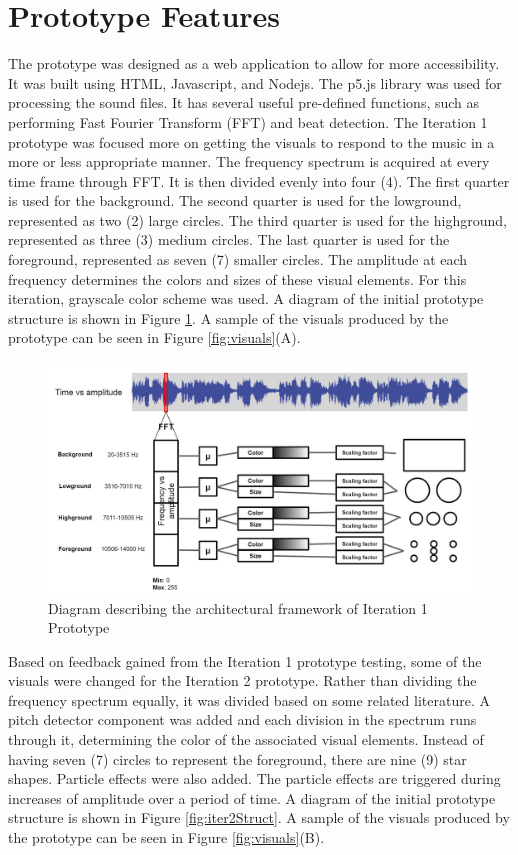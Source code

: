 \section{Prototype Features}
The prototype was designed as a web application to allow for more accessibility. It was built using HTML, Javascript, and Nodejs. The p5.js library was used for processing the sound files. It has several useful pre-defined functions, such as performing Fast Fourier Transform (FFT) and beat detection. The Iteration 1 prototype was focused more on getting the visuals to respond to the music in a more or less appropriate manner. The frequency spectrum is acquired at every time frame through FFT. It is then divided evenly into four (4). The first quarter is used for the background. The second quarter is used for the lowground, represented as two (2) large circles. The third quarter is used for the highground, represented as three (3) medium circles. The last quarter is used for the foreground, represented as seven (7) smaller circles. The amplitude at each frequency determines the colors and sizes of these visual elements. For this iteration, grayscale color scheme was used. A diagram of the initial prototype structure is shown in Figure \ref{fig:iter1Struct}. A sample of the visuals produced by the prototype can be seen in Figure  \ref{fig:visuals}(A).

\begin{figure}[h]
	\centering
	\includegraphics[width=2\columnwidth]{figures/iter1Struct.JPG}
    \caption{Diagram describing the architectural framework of Iteration 1 Prototype}
    \label{fig:iter1Struct}
\end{figure}

Based on feedback gained from the Iteration 1 prototype testing, some of the visuals were changed for the Iteration 2 prototype. Rather than dividing the frequency spectrum equally, it was divided based on some related literature. A pitch detector component was added and each division in the spectrum runs through it, determining the color of the associated visual elements. Instead of having seven (7) circles to represent the foreground, there are nine (9) star shapes. Particle effects were also added. The particle effects are triggered during increases of amplitude over a period of time. A diagram of the initial prototype structure is shown in Figure \ref{fig:iter2Struct}. A sample of the visuals produced by the prototype can be seen in Figure  \ref{fig:visuals}(B).

